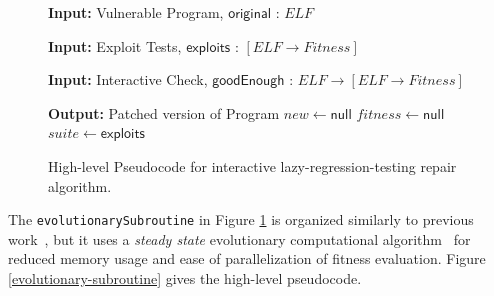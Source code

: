 \documentclass{sigcomm-alternate}
\begin{document}
\begin{figure}[htb]
\begin{algorithmic}[1]
\small
\item[{\textbf{Input: }} {Vulnerable Program, $\mathsf{original}$ : $ELF$}]
\item[{\textbf{Input: }} {Exploit Tests, $\mathsf{exploits}$ : $[ELF \rightarrow Fitness]$}]
\item[{\textbf{Input: }} {Interactive Check, $\mathsf{goodEnough}$ : $ELF \rightarrow [ELF \rightarrow Fitness]$}]
\item[{\textbf{Output: }} {Patched version of Program}] 
   $new \leftarrow \mathsf{null}$ 
   $fitness \leftarrow \mathsf{null}$ 
   $suite \leftarrow \mathsf{exploits}$ 
\end{algorithmic}
\caption{\label{lazy-algorithm}High-level Pseudocode for interactive
lazy-regression-testing repair algorithm.}
\end{figure}

The \texttt{evolutionarySubroutine} in Figure \ref{lazy-algorithm} is
organized similarly to previous work~\cite{genprog-tse-journal},
but it uses a \emph{steady state}
evolutionary computational algorithm~\cite{Luke2013Metaheuristics} for
reduced memory usage and ease of parallelization of fitness evaluation.
Figure \ref{evolutionary-subroutine}  gives the high-level pseudocode.
\end{document}
